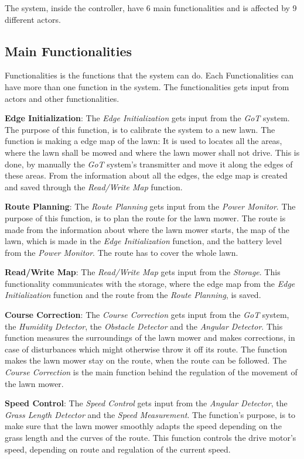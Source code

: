 \noindent
\newpage
The system, inside the controller, have 6 main functionalities and is affected by 9 different actors.


\subsection{Main Functionalities}

Functionalities is the functions that the system can do. Each Functionalities can have more than one function in the system. The functionalities gets input from actors and other functionalities.

\textbf{Edge Initialization}:
The \textit{Edge Initialization} gets input from the \textit{GoT} system. The purpose of this function, is to calibrate the system to a new lawn. The function is making a edge map of the lawn: It is used to locates all the areas, where the lawn shall be mowed and where the lawn mower shall not drive. This is done, by manually the \textit{GoT} system's transmitter and move it along the edges of these areas. From the information about all the edges, the edge map is created and saved through the \textit{Read/Write Map} function.

\textbf{Route Planning}:
The \textit{Route Planning} gets input from the \textit{Power Monitor}. The purpose of this function, is to plan the route for the lawn mower. The route is made from the information about where the lawn mower starts, the map of the lawn, which is made in the \textit{Edge Initialization} function, and the battery level from the \textit{Power Monitor}. The route has to cover the whole lawn.

\textbf{Read/Write Map}:
The \textit{Read/Write Map} gets input from the \textit{Storage}. This functionality communicates with the storage, where the edge map from the \textit{Edge Initialization} function and the route from the \textit{Route Planning}, is saved. 

\textbf{Course Correction}:
The \textit{Course Correction} gets input from the \textit{GoT} system, the \textit{Humidity Detector}, the \textit{Obstacle Detector} and the \textit{Angular Detector}. This function measures the surroundings of the lawn mower and makes corrections, in case of disturbances which might otherwise throw it off its route. The function makes the lawn mower stay on the route, when the route can be followed. The \textit{Course Correction} is the main function behind the regulation of the movement of the lawn mower.

\textbf{Speed Control}:
The \textit{Speed Control} gets input from the \textit{Angular Detector}, the \textit{Grass Length Detector} and the \textit{Speed Measurement}. The function's purpose, is to make sure that the lawn mower smoothly adapts the speed depending on the grass length and the curves of the route. This function controls the drive motor's speed, depending on route and regulation of the current speed.

